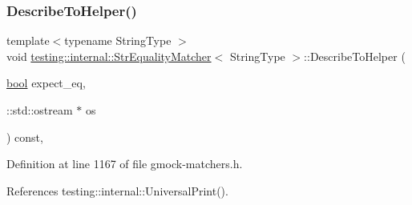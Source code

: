\subsubsection{\texorpdfstring{Describe\+To\+Helper()}{DescribeToHelper()}}
{\footnotesize\ttfamily template$<$typename String\+Type $>$ \\
void \hyperlink{classtesting_1_1internal_1_1StrEqualityMatcher}{testing\+::internal\+::\+Str\+Equality\+Matcher}$<$ String\+Type $>$\+::Describe\+To\+Helper (\begin{DoxyParamCaption}\item[{\hyperlink{classbool}{bool}}]{expect\+\_\+eq,  }\item[{\+::std\+::ostream $\ast$}]{os }\end{DoxyParamCaption}) const\hspace{0.3cm}{\ttfamily [inline]}, {\ttfamily [private]}}



Definition at line 1167 of file gmock-\/matchers.\+h.



References testing\+::internal\+::\+Universal\+Print().


